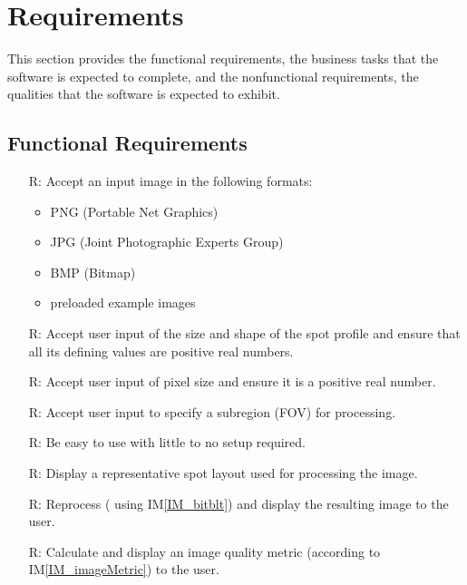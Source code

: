 \documentclass[12pt]{article}
\newcommand{\iref}[1]{IM\ref{#1}}
\newcounter{reqnum} %
\begin{document}

\newpage
\section{Requirements}

This section provides the functional requirements, the business tasks that the
software is expected to complete, and the nonfunctional requirements, the
qualities that the software is expected to exhibit.

\subsection{Functional Requirements}

\noindent \begin{itemize}

\item[R\refstepcounter{reqnum}\thereqnum \label{R_Inputs}:] Accept an input 
image in the following formats:

  \noindent \begin{itemize}
    \item PNG (Portable Net Graphics)
    \item JPG (Joint Photographic Experts Group)
    \item BMP (Bitmap)
    \item preloaded example images
  \end{itemize}

\item[R\refstepcounter{reqnum}\thereqnum \label{R_userSpotProfile}:] Accept user 
input of the size and shape of the spot profile and ensure that all its defining 
values are positive real numbers.

\item[R\refstepcounter{reqnum}\thereqnum \label{R_userPixelSize}:] Accept user 
input of pixel size and ensure it is a positive real number.

\item[R\refstepcounter{reqnum}\thereqnum \label{R_subregion}:] Accept user
input to specify a subregion (FOV) for processing.

\item[R\refstepcounter{reqnum}\thereqnum \label{R_easySetup}:] Be easy to use 
with little to no setup required.

\item[R\refstepcounter{reqnum}\thereqnum \label{R_spotLayout}:] Display a 
representative spot layout used for processing the image.

\item[R\refstepcounter{reqnum}\thereqnum \label{R_resultImage}:] Reprocess (
using \iref{IM_bitblt}) and display the resulting image to the user.

\item[R\refstepcounter{reqnum}\thereqnum \label{R_imageMetric}:] Calculate and 
display an image quality metric (according to \iref{IM_imageMetric}) to the user.

\end{itemize}
\end{document}
